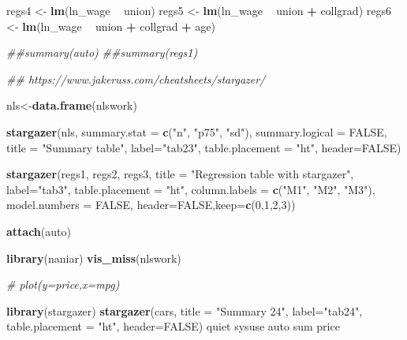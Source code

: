 \documentclass[
  12pt,
]{article}
\newenvironment{Shaded}{\begin{snugshade}}{\end{snugshade}}
\newcommand{\CommentTok}[1]{\textcolor[rgb]{0.56,0.35,0.01}{\textit{#1}}}
\newcommand{\DataTypeTok}[1]{\textcolor[rgb]{0.13,0.29,0.53}{#1}}
\newcommand{\DecValTok}[1]{\textcolor[rgb]{0.00,0.00,0.81}{#1}}
\newcommand{\KeywordTok}[1]{\textcolor[rgb]{0.13,0.29,0.53}{\textbf{#1}}}
\newcommand{\NormalTok}[1]{#1}
\newcommand{\OperatorTok}[1]{\textcolor[rgb]{0.81,0.36,0.00}{\textbf{#1}}}
\newcommand{\OtherTok}[1]{\textcolor[rgb]{0.56,0.35,0.01}{#1}}
\newcommand{\StringTok}[1]{\textcolor[rgb]{0.31,0.60,0.02}{#1}}
\begin{document}
\begin{Shaded}
\begin{Highlighting}[]
\NormalTok{regs4 <-}\StringTok{ }\KeywordTok{lm}\NormalTok{(ln_wage }\OperatorTok{~}\StringTok{ }\NormalTok{union)}
\NormalTok{regs5 <-}\StringTok{ }\KeywordTok{lm}\NormalTok{(ln_wage }\OperatorTok{~}\StringTok{ }\NormalTok{union }\OperatorTok{+}\StringTok{ }\NormalTok{collgrad)}
\NormalTok{regs6 <-}\StringTok{ }\KeywordTok{lm}\NormalTok{(ln_wage }\OperatorTok{~}\StringTok{ }\NormalTok{union }\OperatorTok{+}\StringTok{ }\NormalTok{collgrad }\OperatorTok{+}\StringTok{ }\NormalTok{age)}

\CommentTok{##summary(auto)}
\CommentTok{##summary(regs1)}

\CommentTok{## https://www.jakeruss.com/cheatsheets/stargazer/}

\NormalTok{nls<-}\KeywordTok{data.frame}\NormalTok{(nlswork)}

\KeywordTok{stargazer}\NormalTok{(nls, }\DataTypeTok{summary.stat =} \KeywordTok{c}\NormalTok{(}\StringTok{"n"}\NormalTok{, }\StringTok{"p75"}\NormalTok{, }\StringTok{"sd"}\NormalTok{), }\DataTypeTok{summary.logical =} \OtherTok{FALSE}\NormalTok{, }
          \DataTypeTok{title =} \StringTok{"Summary table"}\NormalTok{,}
          \DataTypeTok{label=}\StringTok{"tab23"}\NormalTok{, }
          \DataTypeTok{table.placement =} \StringTok{"ht"}\NormalTok{, }
          \DataTypeTok{header=}\OtherTok{FALSE}\NormalTok{)}


\KeywordTok{stargazer}\NormalTok{(regs1, regs2, regs3,}
          \DataTypeTok{title =} \StringTok{"Regression table with stargazer"}\NormalTok{,}
          \DataTypeTok{label=}\StringTok{"tab3"}\NormalTok{, }
          \DataTypeTok{table.placement =} \StringTok{"ht"}\NormalTok{, }
          \DataTypeTok{column.labels =} \KeywordTok{c}\NormalTok{(}\StringTok{"M1"}\NormalTok{, }\StringTok{"M2"}\NormalTok{, }\StringTok{"M3"}\NormalTok{),}
          \DataTypeTok{model.numbers =} \OtherTok{FALSE}\NormalTok{,}
          \DataTypeTok{header=}\OtherTok{FALSE}\NormalTok{,}\DataTypeTok{keep=}\KeywordTok{c}\NormalTok{(}\DecValTok{0}\NormalTok{,}\DecValTok{1}\NormalTok{,}\DecValTok{2}\NormalTok{,}\DecValTok{3}\NormalTok{))}

\KeywordTok{attach}\NormalTok{(auto)}


\KeywordTok{library}\NormalTok{(naniar)}
\KeywordTok{vis_miss}\NormalTok{(nlswork)}

\CommentTok{# plot(y=price,x=mpg)}

\KeywordTok{library}\NormalTok{(stargazer)}
\KeywordTok{stargazer}\NormalTok{(cars, }
          \DataTypeTok{title =} \StringTok{"Summary 24"}\NormalTok{,}
          \DataTypeTok{label=}\StringTok{"tab24"}\NormalTok{, }
          \DataTypeTok{table.placement =} \StringTok{"ht"}\NormalTok{, }
          \DataTypeTok{header=}\OtherTok{FALSE}\NormalTok{)}
\NormalTok{quiet sysuse auto}
\NormalTok{sum price}


\end{Highlighting}
\end{Shaded}
\end{document}
